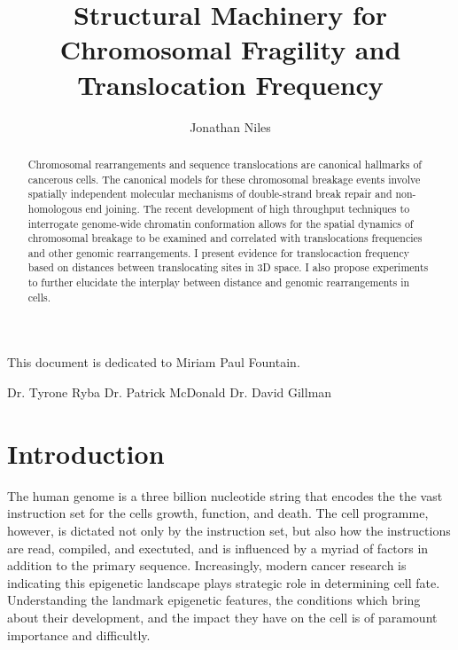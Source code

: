 \documentclass[phd,tocprelim]{cornell}
\title{Structural Machinery for Chromosomal Fragility and Translocation Frequency}
\author{Jonathan Niles}
\begin{document}
\maketitle
\makecopyright

\begin{abstract}
Chromosomal rearrangements and sequence translocations are
canonical hallmarks of cancerous cells.  The canonical models
for these chromosomal breakage events involve spatially
independent molecular mechanisms of double-strand break
repair and non-homologous end joining.  The recent development of high
throughput techniques to interrogate genome-wide chromatin
conformation allows for the spatial dynamics of chromosomal
breakage to be examined and correlated with translocations
frequencies and other genomic rearrangements.  I present
evidence for translocaction frequency based on distances between
translocating sites in 3D space.  I also propose experiments
to further elucidate the interplay between distance and
genomic rearrangements in cells.
\end{abstract}

\begin{dedication}
This document is dedicated to Miriam Paul Fountain.
\end{dedication}

\begin{acknowledgements}
Dr. Tyrone Ryba
Dr. Patrick McDonald
Dr. David Gillman
\end{acknowledgements}

\contentspage
\tablelistpage
\figurelistpage

\normalspacing \setcounter{page}{1} 
\pagestyle{cornell} \addtolength{\parskip}{0.5\baselineskip}

\makeglossaries

\chapter{Introduction}

The human genome is a three billion nucleotide string that encodes the
the vast instruction set for the cells growth, function, and death.  The cell
programme, however, is dictated not only by the instruction set, but also
how the instructions are read, compiled, and exectuted, and is influenced
by a myriad of factors in addition to the primary sequence.  Increasingly,
modern cancer research is indicating this epigenetic landscape plays strategic
role in determining cell fate.  Understanding the landmark epigenetic features,
the conditions which bring about their development, and the impact they have on
the cell is of paramount importance and difficultly.
\end{document}
